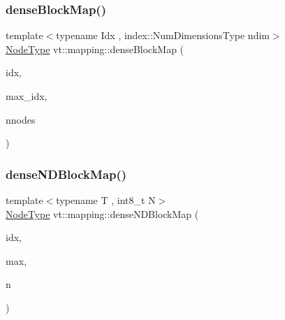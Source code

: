 \mbox{\label{namespacevt_1_1mapping_a290c8ece78ae8ffc8aa79dbb43a743d6}} 
\subsubsection{\texorpdfstring{dense\+Block\+Map()}{denseBlockMap()}}
{\footnotesize\ttfamily template$<$typename Idx , index\+::\+Num\+Dimensions\+Type ndim$>$ \\
\hyperlink{namespacevt_a866da9d0efc19c0a1ce79e9e492f47e2}{Node\+Type} vt\+::mapping\+::dense\+Block\+Map (\begin{DoxyParamCaption}\item[{\hyperlink{namespacevt_1_1mapping_a1bcab0d331bff853fe09c964d5e9cc8c}{Idx\+Ptr}$<$ Idx $>$}]{idx,  }\item[{\hyperlink{namespacevt_1_1mapping_a1bcab0d331bff853fe09c964d5e9cc8c}{Idx\+Ptr}$<$ Idx $>$}]{max\+\_\+idx,  }\item[{\hyperlink{namespacevt_a866da9d0efc19c0a1ce79e9e492f47e2}{Node\+Type}}]{nnodes }\end{DoxyParamCaption})}

\mbox{\label{namespacevt_1_1mapping_a8e5581179e571387304de4b1d19640e7}} 
\subsubsection{\texorpdfstring{dense\+N\+D\+Block\+Map()}{denseNDBlockMap()}}
{\footnotesize\ttfamily template$<$typename T , int8\+\_\+t N$>$ \\
\hyperlink{namespacevt_a866da9d0efc19c0a1ce79e9e492f47e2}{Node\+Type} vt\+::mapping\+::dense\+N\+D\+Block\+Map (\begin{DoxyParamCaption}\item[{\hyperlink{namespacevt_1_1mapping_ab77f5302cd346d499e48a8c796043746}{Idx\+N\+D\+Ptr}$<$ T, N $>$}]{idx,  }\item[{\hyperlink{namespacevt_1_1mapping_ab77f5302cd346d499e48a8c796043746}{Idx\+N\+D\+Ptr}$<$ T, N $>$}]{max,  }\item[{\hyperlink{namespacevt_a866da9d0efc19c0a1ce79e9e492f47e2}{Node\+Type}}]{n }\end{DoxyParamCaption})}


